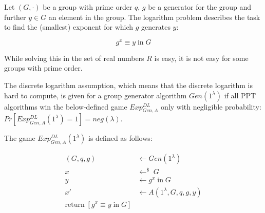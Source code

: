 Let $(G, \cdot)$ be a group with prime order $q$, $g$ be a generator for the group and further $y \in G$ an element in the group.
The logarithm problem describes the task to find the (smallest) exponent for which $g$ generates $y$:

$$
    g^x \equiv y \; \text{in} \; G
$$

While solving this in the set of real numbers $R$ is easy, it is not easy for some groups with prime order.

The discrete logarithm assumption, which means that the discrete logarithm is hard to compute, is given for a group generator algorithm $Gen(1^\lambda)$ if all PPT algorithms win the below-defined game $Exp^{DL}_{Gen,A}$ only with negligible probability: $Pr[Exp^{DL}_{Gen,A}(1^\lambda) = 1] = neg(\lambda)$.

The game $Exp^{DL}_{Gen,A}(1^\lambda)$ is defined as follows:

\begin{align*}
    (G, q, g) & \leftarrow Gen(1^\lambda)           \\
    x         & \leftarrow^\$ \; G                   \\
    y         & \leftarrow g^x \; \text{in} \; G    \\
    x'        & \leftarrow A(1^\lambda, G, q, g, y) \\
    \text{return} \; [g^x \equiv y \; \text{in} \; G ]
\end{align*}


